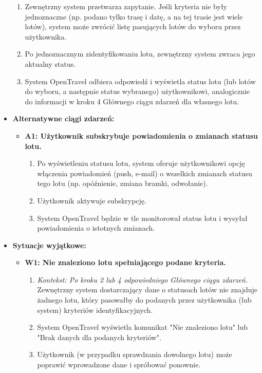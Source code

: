 \documentclass[a4paper,12pt]{article}
\begin{document}
\begin{itemize}
\begin{enumerate}
            \item Zewnętrzny system przetwarza zapytanie. Jeśli kryteria nie były jednoznaczne (np. podano tylko trasę i datę, a na tej trasie jest wiele lotów), system może zwrócić listę pasujących lotów do wyboru przez użytkownika.
            \item Po jednoznacznym zidentyfikowaniu lotu, zewnętrzny system zwraca jego aktualny status.
            \item System OpenTravel odbiera odpowiedź i wyświetla status lotu (lub lotów do wyboru, a następnie status wybranego) użytkownikowi, analogicznie do informacji w kroku 4 Głównego ciągu zdarzeń dla własnego lotu.
        \end{enumerate}
    \item \textbf{Alternatywne ciągi zdarzeń:}
        \begin{itemize}
            \item \textbf{A1: Użytkownik subskrybuje powiadomienia o zmianach statusu lotu.}
                \begin{enumerate}
                    \item Po wyświetleniu statusu lotu, system oferuje użytkownikowi opcję włączenia powiadomień (push, e-mail) o wszelkich zmianach statusu tego lotu (np. opóźnienie, zmiana bramki, odwołanie).
                    \item Użytkownik aktywuje subskrypcję.
                    \item System OpenTravel będzie w tle monitorował status lotu i wysyłał powiadomienia o istotnych zmianach.
                \end{enumerate}
        \end{itemize}
    \item \textbf{Sytuacje wyjątkowe:}
        \begin{itemize}
            \item \textbf{W1: Nie znaleziono lotu spełniającego podane kryteria.}
                \begin{enumerate}
                    \item \textit{Kontekst: Po kroku 2 lub 4 odpowiedniego Głównego ciągu zdarzeń.} Zewnętrzny system dostarczający dane o statusach lotów nie znajduje żadnego lotu, który pasowałby do podanych przez użytkownika (lub system) kryteriów identyfikacyjnych.
                    \item System OpenTravel wyświetla komunikat "Nie znaleziono lotu" lub "Brak danych dla podanych kryteriów".
                    \item Użytkownik (w przypadku sprawdzania dowolnego lotu) może poprawić wprowadzone dane i spróbować ponownie.

\end{enumerate}
\end{itemize}
\end{itemize}
\end{document}
